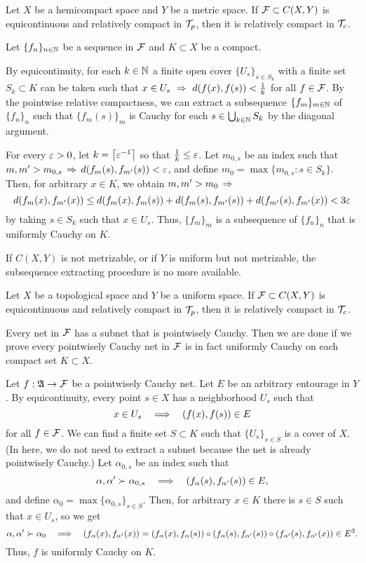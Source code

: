 \documentclass{../exp}
\begin{document}
\begin{thm}
Let $X$ be a hemicompact space and $Y$ be a metric space.
If $\mathcal{F}\subset C(X,Y)$ is equicontinuous and relatively compact in $\mathcal{T}_p$, then it is relatively compact in $\mathcal{T}_c$.
\end{thm}
\begin{pf}
Let $\{f_n\}_{n\in\mathbb{N}}$ be a sequence in $\mathcal{F}$ and $K\subset X$ be a compact.

By equicontinuity, for each $k\in\mathbb{N}$ a finite open cover $\{U_s\}_{s\in S_k}$ with a finite set $S_k\subset K$ can be taken such that $x\in U_s\,\impl\,d(f(x),f(s))<\frac1k$ for all $f\in\mathcal{F}$.
By the pointwise relative compactness, we can extract a subsequence $\{f_m\}_{m\in\mathbb{N}}$ of $\{f_n\}_n$ such that $\{f_m(s)\}_m$ is Cauchy for each $s\in\bigcup_{k\in\mathbb{N}}S_k$ by the diagonal argument.

For every $\varepsilon>0$, let $k=\left\lceil\varepsilon^{-1}\right\rceil$ so that $\frac1k\le\varepsilon$.
Let $m_{0,s}$ be an index such that $m,m'>m_{0,s}\impl d(f_m(s),f_{m'}(s))<\e$, and define $m_0=\max\{m_{0,s}:s\in S_k\}$.
Then, for arbitrary $x\in K$, we obtain $m,m'>m_0\impl$
\[d(f_m(x),f_{m'}(x))\le d(f_m(x),f_m(s))+d(f_m(s),f_{m'}(s))+d(f_{m'}(s),f_{m'}(x))<3\varepsilon\]
by taking $s\in S_k$ such that $x\in U_s$.
Thus, $\{f_m\}_m$ is a subsequence of $\{f_n\}_n$ that is uniformly Cauchy on $K$.
\end{pf}

If $C(X,Y)$ is not metrizable, or if $Y$ is uniform but not metrizable, the subsequence extracting procedure is no more available.

\begin{thm}
Let $X$ be a topological space and $Y$ be a uniform space.
If $\mathcal{F}\subset C(X,Y)$ is equicontinuous and relatively compact in $\mathcal{T}_p$, then it is relatively compact in $\mathcal{T}_c$.
\end{thm}
\begin{pf}[1]
Every net in $\mathcal{F}$ has a subnet that is pointwisely Cauchy.
Then we are done if we prove every pointwisely Cauchy net in $\mathcal{F}$ is in fact uniformly Cauchy on each compact set $K\subset X$.

Let $f:\fA\to\cF$ be a pointwisely Cauchy net.
Let $E$ be an arbitrary entourage in $Y$.
By equicontinuity, every point $s\in X$ has a neighborhood $U_s$ such that
\[x\in U_s\impl(f(x),f(s))\in E\]
for all $f\in\mathcal{F}$.
We can find a finite set $S\subset K$ such that $\{U_s\}_{s\in S}$ is a cover of $X$.
(In here, we do not need to extract a subnet because the net is already pointwisely Cauchy.)
Let $\alpha_{0,s}$ be an index such that
\[\alpha,\alpha'\succ\alpha_{0,s}\impl(f_\alpha(s),f_{\alpha'}(s))\in E,\]
and define $\alpha_0=\max\{\alpha_{0,s}\}_{s\in S}$.
Then, for arbitrary $x\in K$ there is $s\in S$ such that $x\in U_s$, so we get
\[\alpha,\alpha'\succ\alpha_0\impl(f_\alpha(x),f_{\alpha'}(x))=(f_\alpha(x),f_\alpha(s))\o(f_\alpha(s),f_{\alpha'}(s))\o(f_{\alpha'}(s),f_{\alpha'}(x))\in E^3.\]
Thus, $f$ is uniformly Cauchy on $K$.
\end{pf}
\end{document}
